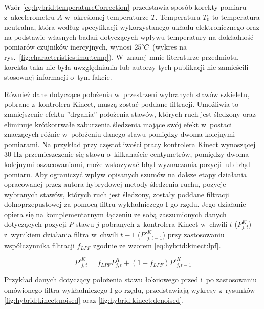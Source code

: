 Wzór \ref{eq:hybrid:temperatureCorrection} przedstawia sposób korekty pomiaru z~akcelerometru $A$ w~określonej temperaturze $T$. Temperatura $T_0$ to temperatura neutralna, która według specyfikacji wykorzystanego układu elektronicznego oraz na podstawie własnych badań dotyczących wpływu temperatury na dokładność pomiarów czujników inercyjnych, wynosi $25\degree C$ (wykres na rys.~\ref{fig:characteristics:imu:temp}). W~znanej mnie literaturze przedmiotu, korekta taka nie była uwzględniania lub autorzy tych publikacji nie zamieścili stosownej informacji o~tym fakcie.
						
Również dane dotyczące położenia w~przestrzeni wybranych stawów szkieletu, pobrane z~kontrolera Kinect, muszą zostać poddane filtracji. Umożliwia to zmniejszenie efektu ''drgania'' położenia stawów, których ruch jest śledzony oraz eliminuje krótkotrwałe zaburzenia śledzenia mające swój efekt w~postaci znaczących różnic w~położeniu danego stawu pomiędzy dwoma kolejnymi pomiarami. Na przykład przy częstotliwości pracy kontrolera Kinect wynoszącej 30 Hz przemieszczenie się stawu o~kilkanaście centymetrów, pomiędzy dwoma kolejnymi oszacowaniami, może wskazywać błąd wyznaczania pozycji lub błąd pomiaru. Aby ograniczyć wpływ opisanych szumów na dalsze etapy działania opracowanej przez autora hybrydowej metody śledzenia ruchu, pozycje wybranych stawów, których ruch jest śledzony, zostały poddane filtracji dolnoprzepustowej za pomocą filtru wykładniczego I-go rzędu. Jego działanie opiera się na komplementarnym łączeniu ze sobą zaszumionych danych dotyczących pozycji $P$ stawu $j$ pobranych z~kontrolera Kinect w~chwili $t$ ($P^K_{j,t}$) z~wynikiem działania filtra w~chwili $t-1$ ($P'^K_{j,t-1}$) przy zastosowaniu współczynnika filtracji $f_{LPF}$ zgodnie ze wzorem \ref{eq:hybrid:kinect:lpf}.

\begin{equation}
	\label{eq:hybrid:kinect:lpf}
	P'^K_{j,t} = f_{LPF} P^K_{j,t} + (1-f_{LPF})P'^K_{j,t-1}
\end{equation}

Przykład danych dotyczący położenia stawu łokciowego przed i~po zastosowaniu omówionego filtra wykładniczego I-go rzędu, przedstawiają wykresy z~rysunków \ref{fig:hybrid:kinect:noised} oraz \ref{fig:hybrid:kinect:denoised}.
						
